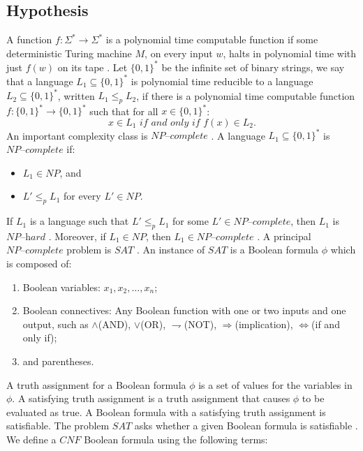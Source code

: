 \documentclass[a4paper,UKenglish,cleveref, autoref]{lipics-v2019}
\begin{document}
\subsection{Hypothesis}

A function $f : \Sigma^{*} \rightarrow \Sigma^{*}$ is a polynomial time computable function if some deterministic Turing machine $M$, on every input $w$, halts in polynomial time with just $f(w)$ on its tape \cite{MS06}. Let $\{0, 1\}^{*}$ be the infinite set of binary strings, we say that a language $L_{1} \subseteq \{0, 1\}^{*}$ is polynomial time reducible to a language $L_{2} \subseteq \{0, 1\}^{*}$, written $L_{1} \leq_{p} L_{2}$, if there is a polynomial time computable function $f : \{0, 1\}^{*} \rightarrow \{0, 1\}^{*}$ such that for all $x \in \{0, 1\}^{*}$:
\[x \in L_{1} \textit{ if and only if } f(x) \in L_{2}.\]
An important complexity class is $\textit{NP--complete}$ \cite{GJ79}. A language $L_{1} \subseteq \{0, 1\}^{*}$ is $\textit{NP--complete}$ if:

\begin{itemize}
\item $L_{1} \in NP$, and
\item $L' \leq_{p} L_{1}$ for every $L' \in NP$.
\end{itemize}

If $L_{1}$ is a language such that $L' \leq_{p} L_{1}$ for some $L' \in \textit{NP--complete}$, then $L_{1}$ is $\textit{NP--hard}$ \cite{CLRS01}. Moreover, if $L_{1} \in NP$, then $L_{1} \in \textit{NP--complete}$ \cite{CLRS01}. A principal $\textit{NP--complete}$ problem is $SAT$ \cite{GJ79}. An instance of $SAT$ is a Boolean formula $\phi$ which is composed of:

\begin{enumerate}
\item Boolean variables: $x_{1}, x_{2},\ldots, x_{n}$;
\item Boolean connectives: Any Boolean function with one or two inputs and one output, such as $\wedge$(AND), $\vee$(OR), $\rightharpoondown$(NOT), $\Rightarrow$(implication), $\Leftrightarrow$(if and only if);
\item and parentheses.
\end{enumerate}

A truth assignment for a Boolean formula $\phi$ is a set of values for the variables in $\phi$. A satisfying truth assignment is a truth assignment that causes $\phi$ to be evaluated as true. A Boolean formula with a satisfying truth assignment is satisfiable. The problem $SAT$ asks whether a given Boolean formula is satisfiable \cite{GJ79}. We define a $CNF$ Boolean formula using the following terms:
\end{document}
